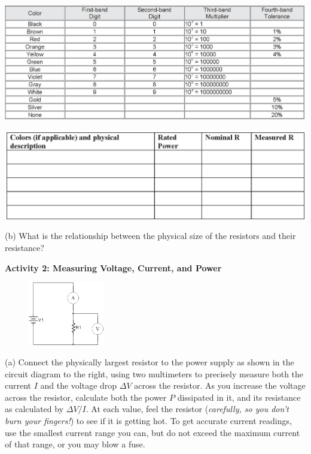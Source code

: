 \begin{center}
\includegraphics[width=1.0\textwidth]{electric_power/color_code.eps}

\vspace{0.2in}
\includegraphics[width=1.0\textwidth]{electric_power/resistor_description.eps}
\end{center}

(b) What is the relationship between the physical size of the resistors and their resistance?
\vspace{1.0in}

\pagebreak
\textbf{Activity 2: Measuring Voltage, Current, and Power}

\begin{figure}
    \vspace{-0.4 in}
    \includegraphics[width=0.3\textwidth]{electric_power/circ_diagram_bw.eps}
\end{figure}

(a) Connect the physically largest resistor to the power supply as shown in the circuit diagram to the right, using two multimeters to precisely measure both the current $I$ and the voltage drop $\Delta V$ across the resistor.  As you increase the voltage across the resistor, calculate both the power $P$ dissipated in it, and its resistance as calculated by $\Delta V/I$.  At each value, feel the resistor (\textit{carefully, so you don't burn your fingers!}) to see if it is getting hot.  To get accurate current readings, use the smallest current range you can, but do not exceed the maximum current of that range, or you may blow a fuse.

